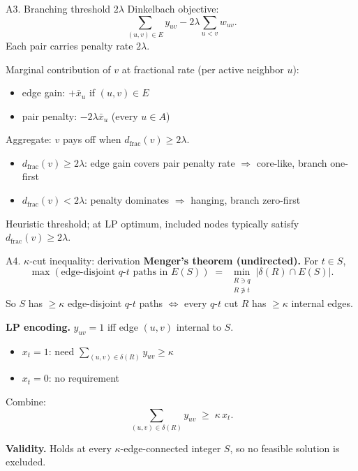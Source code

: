 \documentclass{beamer}
\begin{document}
\begin{frame}{A3. Branching threshold $2\lambda$}
  Dinkelbach objective:
  \[
    \sum_{(u,v)\in E} y_{uv} - 2\lambda \sum_{u<v} w_{uv}.
  \]
  Each pair carries penalty rate $2\lambda$.

  \vfill

  Marginal contribution of $v$ at fractional rate (per active neighbor $u$):
  \begin{itemize}
    \item edge gain: $+\bar{x}_u$ if $(u,v) \in E$
    \item pair penalty: $-2\lambda \bar{x}_u$ (every $u \in A$)
  \end{itemize}

  \vfill

  Aggregate: $v$ pays off when $d_{\mathrm{frac}}(v) \ge 2\lambda$.

  \vfill

  \begin{itemize}
    \item $d_{\mathrm{frac}}(v) \ge 2\lambda$: edge gain covers pair penalty rate $\Rightarrow$ core-like, branch one-first
    \item $d_{\mathrm{frac}}(v) < 2\lambda$: penalty dominates $\Rightarrow$ hanging, branch zero-first
  \end{itemize}

  \vfill

  Heuristic threshold; at LP optimum, included nodes typically satisfy $d_{\mathrm{frac}}(v) \ge 2\lambda$.
\end{frame}


\begin{frame}{A4. $\kappa$-cut inequality: derivation}
  \textbf{Menger's theorem (undirected).} For $t \in S$,
  \[
    \max(\text{edge-disjoint } q\text{-}t \text{ paths in } E(S)) \;=\; \min_{\substack{R \ni q \\ R \not\ni t}} |\delta(R) \cap E(S)|.
  \]
  So $S$ has $\ge \kappa$ edge-disjoint $q$-$t$ paths $\iff$ every $q$-$t$ cut $R$ has $\ge \kappa$ internal edges.

  \vfill

  \textbf{LP encoding.} $y_{uv} = 1$ iff edge $(u,v)$ internal to $S$.
  \begin{itemize}
    \item $x_t = 1$: need $\sum_{(u,v) \in \delta(R)} y_{uv} \ge \kappa$
    \item $x_t = 0$: no requirement
  \end{itemize}
  Combine:
  \[
    \sum_{(u,v) \in \delta(R)} y_{uv} \;\ge\; \kappa \, x_t.
  \]

  \vfill

  \textbf{Validity.} Holds at every $\kappa$-edge-connected integer $S$, so no feasible solution is excluded.
\end{frame}
\end{document}
